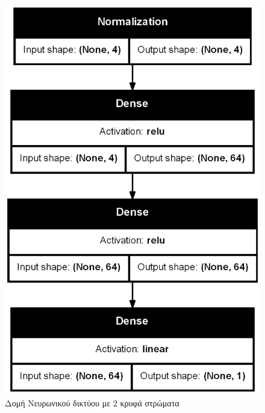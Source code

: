 \begin{figure}[H]
\begin{minipage}{0.4\textwidth}
      \includegraphics[width=\linewidth]{images/Results/Neural Net/2HL/structure.png}
      \caption{Δομή Νευρωνικού δικτύου με $2$ κρυφά στρώματα}
      \label{fig:Neural Network Structure with 2 Hidden layer}


  \end{minipage}
\end{figure}


